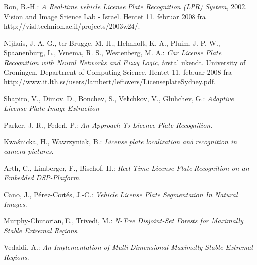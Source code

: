 \documentclass[11pt,a4paper,final]{article}
\begin{document}
\begin{thebibliography}{99}
%

 Ron, B.-H.: \textit{A Real-time vehicle License Plate Recognition (LPR) System}, 2002. Vision and Image Science Lab - Israel. Hentet 11. februar 2008 fra http://visl.technion.ac.il/projects/2003w24/.

 Nijhuis, J. A. G., ter Brugge, M. H., Helmholt, K. A., Pluim, J. P. W., Spaanenburg, L., Venema, R. S., Westenberg, M. A.: \textit{Car License Plate Recognition with Neural Networks and Fuzzy Logic}, årstal ukendt. University of Groningen, Department of Computing Science. Hentet 11. februar 2008 fra http://www.it.lth.se/users/lambert/leftovers/LicenseplateSydney.pdf.

 Shapiro, V., Dimov, D., Bonchev, S., Velichkov, V., Gluhchev, G.: \textit{Adaptive License Plate Image Extraction}

 Parker, J. R., Federl, P.: \textit{An Approach To Licence Plate Recognition}.

 Kwa\'snicka, H., Wawrzyniak, B.: \textit{License plate localization and recognition in camera pictures}.

 Arth, C., Limberger, F., Bischof, H.: \textit{Real-Time License Plate Recognition on an Embedded DSP-Platform}.

 Cano, J., Pérez-Cortés, J.-C.: \textit{Vehicle License Plate Segmentation In Natural Images}.





 Murphy-Chutorian, E., Trivedi, M.: \textit{N-Tree Disjoint-Set Forests for Maximally Stable Extremal Regions}.

 Vedaldi, A.: \textit{An Implementation of Multi-Dimensional Maximally Stable Extremal Regions}.


\end{thebibliography}
\end{document}

